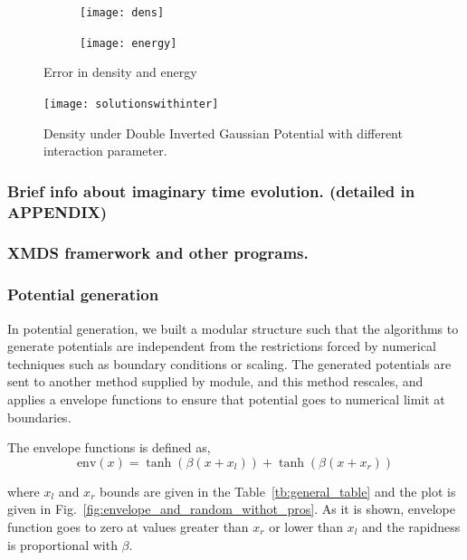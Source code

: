\documentclass[a4paper,times,12pt]{article}
\begin{document}
\graphicspath{{"../figs/numericanalyze/"}}
\begin{figure}[H]
    \centering
    \begin{subfigure}[t]{0.45\textwidth}
        \texttt{[image: dens]}
		
    \end{subfigure}
    \begin{subfigure}[t]{0.45\textwidth}
        \texttt{[image: energy]}
		
    \end{subfigure}
    \caption{Error in density and energy}
\label{fig:dens_energy_error}
\end{figure}


\graphicspath{{"../figs/potentials/"}}
\begin{figure}[H]
    \texttt{[image: solutionswithinter]}
    \caption{Density under Double Inverted Gaussian Potential with different interaction parameter.}
\label{fig:gaussian_pot_and_density}
\end{figure}

\subsubsection{Brief info about imaginary time evolution. (detailed in APPENDIX)}
\subsubsection{XMDS framerwork and other programs.}
\subsubsection{Potential generation}

In potential generation, we built a modular structure such that the algorithms to generate potentials are independent from the restrictions forced by numerical techniques such as boundary conditions or scaling. The generated potentials are sent to another method supplied by module, and this method rescales, and applies a envelope functions to ensure that potential goes to numerical limit at boundaries.

The envelope functions is defined as,
\begin{equation}
\label{eq:envelope_potential}
    \text{env}(x) = \tanh{(\beta(x + x_l))} + \tanh{(\beta(x + x_r))}
\end{equation}

where $x_l$ and $x_r$ bounds are given in the Table~\ref{tb:general_table} and the plot is given in Fig.~\ref{fig:envelope_and_random_withot_pros}. As it is shown, envelope function goes to zero at values greater than $x_r$ or lower than $x_l$ and the rapidness is proportional with $\beta$.
\end{document}
